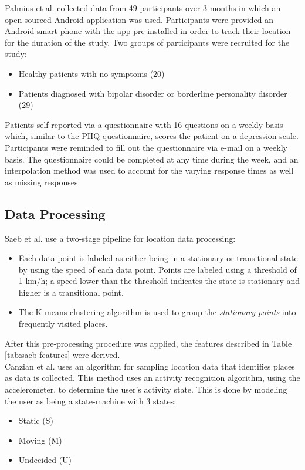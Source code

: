 Palmius et al. collected data from 49 participants over 3 months in which an open-sourced Android application was used. Participants were provided an Android smart-phone with the app pre-installed in order to track their location for the duration of the study. Two groups of participants were recruited for the study:

\begin{itemize}
    \item Healthy patients with no symptoms (20)
    \item Patients diagnosed with bipolar disorder or borderline personality disorder (29)
\end{itemize}

Patients self-reported via a questionnaire with 16 questions on a weekly basis which, similar to the PHQ questionnaire, scores the patient on a depression scale. Participants were reminded to fill out the questionnaire via e-mail on a weekly basis. The questionnaire could be completed at any time during the week, and an interpolation method was used to account for the varying response times as well as missing responses.

\subsection{Data Processing}
Saeb et al. use a two-stage pipeline for location data processing: 
\begin{itemize}
    \item Each data point is labeled as either being in a stationary or transitional state by using the speed of each data point. Points are labeled using a threshold of 1 km/h; a speed lower than the threshold indicates the state is stationary and higher is a transitional point. 
    \item The K-means clustering algorithm is used to group the \textit{stationary points} into frequently visited places. 
\end{itemize}

After this pre-processing procedure was applied, the features described in Table \ref{tab:saeb-features} were derived.\\ 

Canzian et al. uses an algorithm for sampling location data that identifies places as data is collected. This method uses an activity recognition algorithm, using the accelerometer, to determine the user's activity state. This is done by modeling the user as being a state-machine with 3 states: 
\begin{itemize}
    \item Static (S)
    \item Moving (M)
    \item Undecided (U)
\end{itemize}

